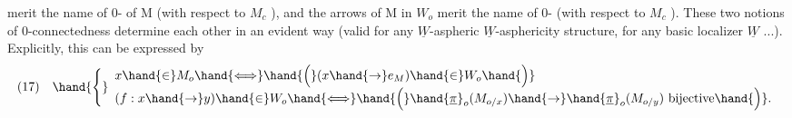 merit the name of 0-\hand{\uline{\textcolor{black}{connected}}} \hand{\uline{\textcolor{black}{objects}}} of M (with respect to $M_c$ ), and
the arrows of M in $W_o$ merit the name of 0-\hand{\uline{\textcolor{black}{connected}}} \hand{\uline{\textcolor{black}{maps}}}\hand{$^*$}(with respect
to $M_c$ ). \hand{\unsure{\&}} These two notions of 0-connectedness determine each other in an
evident way (valid for any $\underline{W}$-aspheric $\underline{W}$-asphericity structure, for
any basic localizer $\underline{W}$ ...). Explicitly, this can be expressed by
\[
(17)\quad \hand{\Biggl\{}\begin{array}{l}
x\hand{\in} M_o \hand{\Longleftrightarrow} \hand{\Bigl(}(x\hand{\to} e_M)\hand{\in} W_o\hand{\Bigr)}\\
(f:x\hand{\to} y)\hand{\in} W_o \hand{\Longleftrightarrow} \hand{\Bigl(}\hand{\underline{\pi}}_o(M_{o/x})\hand{\to} \hand{\underline{\pi}}_o(M_{o/y}) \text{ bijective}\hand{\Bigr)}.
\end{array}
\]

